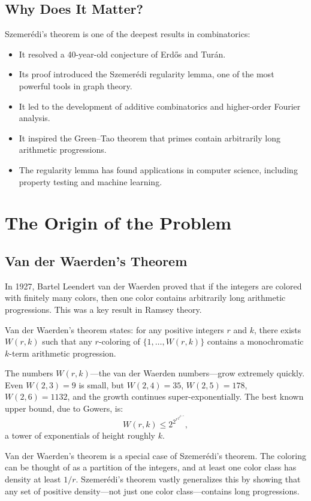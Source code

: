 \subsection{Why Does It Matter?}

Szemer\'edi's theorem is one of the deepest results in combinatorics:
\begin{itemize}
\item It resolved a 40-year-old conjecture of Erd\H{o}s and Tur\'an.
\item Its proof introduced the Szemer\'edi regularity lemma, one of the most powerful tools in graph theory.
\item It led to the development of additive combinatorics and higher-order Fourier analysis.
\item It inspired the Green--Tao theorem that primes contain arbitrarily long arithmetic progressions.
\item The regularity lemma has found applications in computer science, including property testing and machine learning.
\end{itemize}

\section{The Origin of the Problem}

\subsection{Van der Waerden's Theorem}

In 1927, Bartel Leendert van der Waerden proved that if the integers are colored with finitely many colors, then one color contains arbitrarily long arithmetic progressions. This was a key result in Ramsey theory.

Van der Waerden's theorem states: for any positive integers $r$ and $k$, there exists $W(r,k)$ such that any $r$-coloring of $\{1,\ldots,W(r,k)\}$ contains a monochromatic $k$-term arithmetic progression.

The numbers $W(r,k)$---the van der Waerden numbers---grow extremely quickly. Even $W(2,3) = 9$ is small, but $W(2,4) = 35$, $W(2,5) = 178$, $W(2,6) = 1132$, and the growth continues super-exponentially. The best known upper bound, due to Gowers, is:
\[
W(r,k) \leq 2^{2^{r^{2^{2^{k+9}}}}},
\]
a tower of exponentials of height roughly $k$.

Van der Waerden's theorem is a special case of Szemer\'edi's theorem. The coloring can be thought of as a partition of the integers, and at least one color class has density at least $1/r$. Szemer\'edi's theorem vastly generalizes this by showing that any set of positive density---not just one color class---contains long progressions.

